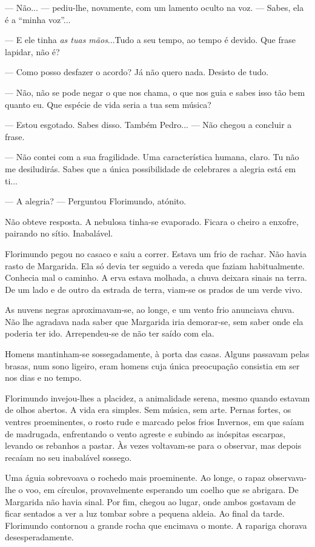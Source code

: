 --- Não... --- pediu-lhe, novamente, com um lamento oculto na voz. --- Sabes,
ela é a ``minha voz''...

--- E ele tinha \emph{as tuas mãos}...Tudo a seu tempo, ao tempo é devido. Que
frase lapidar, não é?

--- Como posso desfazer o acordo? Já não quero nada. Desisto de tudo.

--- Não, não se pode negar o que nos chama, o que nos guia e sabes isso
tão bem quanto eu. Que espécie de vida seria a tua sem música?

--- Estou esgotado. Sabes disso. Também Pedro... --- Não chegou a concluir a
frase.

--- Não contei com a sua fragilidade. Uma característica humana, claro. Tu
não me desiludirás. Sabes que a única possibilidade de celebrares a
alegria está em ti...

--- A alegria? --- Perguntou Florimundo, atónito.

Não obteve resposta. A nebulosa tinha-se evaporado. Ficara o cheiro a
enxofre, pairando no sítio. Inabalável.

Florimundo pegou no casaco e saiu a correr. Estava um frio de rachar.
Não havia rasto de Margarida. Ela só devia ter seguido a vereda que
faziam habitualmente. Conhecia mal o caminho. A erva estava molhada, a
chuva deixara sinais na terra. De um lado e de outro da estrada de
terra, viam-se os prados de um verde vivo.

As nuvens negras aproximavam-se, ao longe, e um vento frio anunciava
chuva. Não lhe agradava nada saber que Margarida iria demorar-se, sem
saber onde ela poderia ter ido. Arrependeu-se de não ter saído com ela.

Homens mantinham-se sossegadamente, à porta das casas. Alguns passavam
pelas brasas, num sono ligeiro, eram homens cuja única preocupação
consistia em ser nos dias e no tempo.

Florimundo invejou-lhes a placidez, a animalidade serena, mesmo quando
estavam de olhos abertos. A vida era simples. Sem música, sem arte.
Pernas fortes, os ventres proeminentes, o rosto rude e marcado pelos
frios Invernos, em que saíam de madrugada, enfrentando o vento agreste e
subindo as inóspitas escarpas, levando os rebanhos a pastar. Às vezes
voltavam-se para o observar, mas depois recaíam no seu inabalável
sossego.

Uma águia sobrevoava o rochedo mais proeminente. Ao longe, o rapaz
observava-lhe o voo, em círculos, provavelmente esperando um coelho que
se abrigara. De Margarida não havia sinal. Por fim, chegou ao lugar,
onde ambos gostavam de ficar sentados a ver a luz tombar sobre a pequena
aldeia. Ao final da tarde. Florimundo contornou a grande rocha que
encimava o monte. A rapariga chorava desesperadamente.

